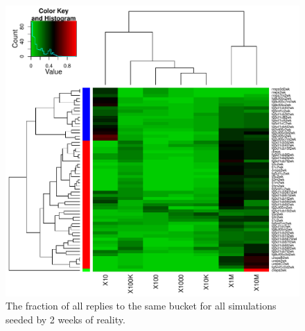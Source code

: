 \documentclass[10pt,oneside]{memoir}
\begin{document}
\begin{Spacing}{2}
\begin{figure}
\begin{center}
    \includegraphics{figures/crop/heatmap-b2br-self-rel-medians-2wk}
    \caption{The fraction of all replies to the same bucket for all simulations seeded by 2 weeks of reality.}
    \label{figure:heatmap-b2br-self-rel-medians-2wk}
\end{center}
\end{figure}


\end{Spacing}
\end{document}
